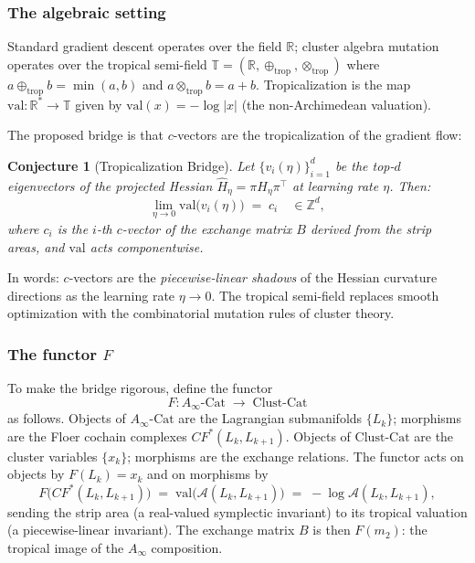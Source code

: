 \documentclass[11pt]{amsart}
\newtheorem{conjecture}[theorem]{Conjecture}
\begin{document}
\subsubsection*{The algebraic setting}

Standard gradient descent operates over the field $\mathbb{R}$;
cluster algebra mutation operates over the tropical semi-field
$\mathbb{T} = (\mathbb{R}, \oplus_\mathrm{trop}, \otimes_\mathrm{trop})$
where $a \oplus_\mathrm{trop} b = \min(a,b)$ and
$a \otimes_\mathrm{trop} b = a + b$.
Tropicalization is the map $\mathrm{val}: \mathbb{R}^* \to \mathbb{T}$
given by $\mathrm{val}(x) = -\log|x|$ (the non-Archimedean valuation).

The proposed bridge is that $c$-vectors are the tropicalization of the
gradient flow:

\begin{conjecture}[Tropicalization Bridge]
\label{thm:trop_bridge}
Let $\{v_i(\eta)\}_{i=1}^d$ be the top-$d$ eigenvectors of the
projected Hessian $\hat{H}_\eta = \pi H_\eta \pi^\top$ at
learning rate $\eta$.
Then:
\[
  \lim_{\eta \to 0} \mathrm{val}\bigl(v_i(\eta)\bigr)
  \;=\; c_i \quad \in \mathbb{Z}^d,
\]
where $c_i$ is the $i$-th $c$-vector of the exchange matrix $B$
derived from the strip areas, and $\mathrm{val}$ acts
componentwise.
\end{conjecture}

\noindent
In words: $c$-vectors are the \emph{piecewise-linear shadows} of the
Hessian curvature directions as the learning rate $\eta \to 0$.
The tropical semi-field replaces smooth optimization with
the combinatorial mutation rules of cluster theory.

\subsubsection*{The functor $F$}

To make the bridge rigorous, define the functor
\[
  F: A_\infty\text{-Cat} \;\longrightarrow\; \mathrm{Clust\text{-}Cat}
\]
as follows.
Objects of $A_\infty\text{-Cat}$ are the Lagrangian submanifolds
$\{L_k\}$; morphisms are the Floer cochain complexes $CF^*(L_k, L_{k+1})$.
Objects of $\mathrm{Clust\text{-}Cat}$ are the cluster variables
$\{x_k\}$; morphisms are the exchange relations.
The functor acts on objects by $F(L_k) = x_k$ and on morphisms by
\[
  F\bigl(CF^*(L_k, L_{k+1})\bigr)
  \;=\; \mathrm{val}\bigl(\mathcal{A}(L_k, L_{k+1})\bigr)
  \;=\; -\log\mathcal{A}(L_k, L_{k+1}),
\]
sending the strip area (a real-valued symplectic invariant) to its
tropical valuation (a piecewise-linear invariant).
The exchange matrix $B$ is then $F(m_2)$: the tropical image of the
$A_\infty$ composition.
\end{document}
